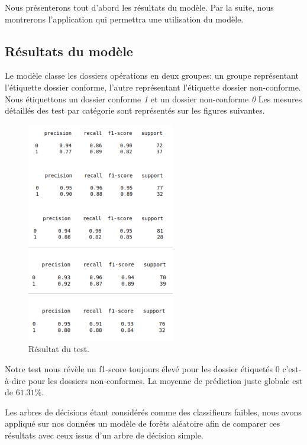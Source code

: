 Nous présenterons tout d'abord les résultats du modèle. Par la suite, nous
montrerons l'application qui permettra une utilisation du modèle.

  \subsection{Résultats du modèle}
  Le modèle classe les dossiers opérations en deux groupes: un groupe
  représentant l'étiquette dossier conforme, l'autre représentant l'étiquette
  dossier non-conforme. Nous étiquettons un dossier conforme \textit{1} et un
  dossier non-conforme \textit{0}
  Les mesures détaillés des test par catégorie sont représentés sur les figures suivantes.

     \begin{figure}[h!]
        \begin{center}
          \includegraphics{images/all222.png}
          \caption{Résultat du test. \label{fig:result}}
        \end{center}
      \end{figure}

  Notre test nous révèle un f1-score toujours élevé pour les dossier étiquetés 0
c'est-à-dire pour les dossiers non-conformes. La moyenne de prédiction juste
globale est de $61.31\%$.

Les arbres de décisions étant considérés comme des classifieurs faibles, nous
avons appliqué sur nos données un modèle de forêts aléatoire afin de comparer
ces résultats avec ceux issus d'un arbre de décision simple.

